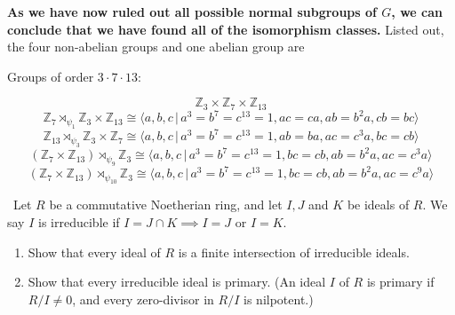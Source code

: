 \documentclass[12pt]{AlgebraQual}
\begin{document}
\begin{solution}
\begin{enumerate}[label=(\alph*)]
    \textbf{As we have now ruled out all possible normal subgroups of $G$, we can conclude that we have found all of the isomorphism classes.} Listed out, the four non-abelian groups and one abelian group are

    \begin{framed}
    Groups of order $3\cdot 7\cdot 13$:


    $$\mathbb{Z}_3\times\mathbb{Z}_7\times \mathbb{Z}_{13}$$
    \vspace{-0.25cm}
    $$\mathbb{Z}_7\rtimes_{\psi_1}\mathbb{Z}_3\times\mathbb{Z}_{13}\cong \langle a,b,c\,|\, a^3=b^7=c^{13}=1, ac=ca, ab=b^2a, cb=bc\rangle$$
    \vspace{-0.25cm}
    $$\mathbb{Z}_{13}\rtimes_{\psi_3}\mathbb{Z}_3\times\mathbb{Z}_{7}\cong\langle a,b,c\,|\, a^3=b^7=c^{13}=1, ab=ba, ac=c^3a, bc=cb\rangle$$
    \vspace{-0.35cm}
    $$(\mathbb{Z}_7\times \mathbb{Z}_{13})\rtimes_{\psi_9}\mathbb{Z}_3\cong\langle a,b,c\,|\, a^3=b^7=c^{13}=1, bc=cb, ab=b^2a, ac=c^3a\rangle$$
    \vspace{-0.38cm}
    $$(\mathbb{Z}_7\times \mathbb{Z}_{13})\rtimes_{\psi_{10}}\mathbb{Z}_3\cong\langle a,b,c\,|\, a^3=b^7=c^{13}=1, bc=cb, ab=b^2a, ac=c^9a\rangle$$
    \end{framed}
\end{enumerate}
\end{solution}
\newpage

\begin{problem} $\,$
Let $R$ be a commutative Noetherian ring, and let $I,J$ and $K$ be ideals of $R$. We say $I$ is irreducible if $I=J\cap K\implies I=J$ or $I=K$.
\begin{enumerate}[label=(\alph*)]
    \item Show that every ideal of $R$ is a finite intersection of irreducible ideals.
    \item Show that every irreducible ideal is primary. (An ideal $I$ of $R$ is primary if $R/I\not=0$, and every zero-divisor in $R/I$ is nilpotent.)
\end{enumerate}
\end{problem}
\end{document}
